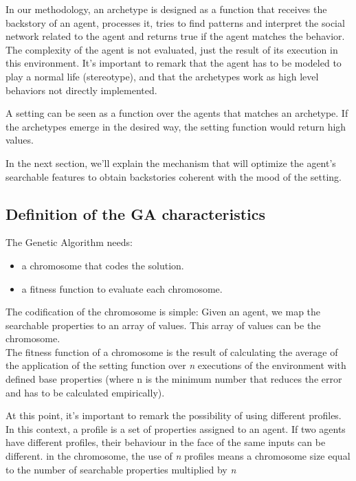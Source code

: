 \documentclass{sig-alternate}
\begin{document}
In our methodology, an archetype is designed as a function that receives the backstory of an agent, processes it, tries to find patterns and interpret the social network related to the agent and returns true if the agent matches the behavior. 
The complexity of the agent is not evaluated, just the result of its execution in this environment. It's important to remark that the agent has to be modeled to play a normal life (stereotype), and that the archetypes work as high level behaviors not directly implemented.

A setting can be seen as a function over the agents that matches an archetype. If the archetypes emerge in the desired way, the setting function would return high values.

In the next section, we'll explain the mechanism that will optimize the agent's searchable features to obtain backstories coherent with the mood of the setting.

\subsection{Definition of the GA characteristics}

The Genetic Algorithm needs:
\begin{itemize}
\item a chromosome that codes the solution.
\item a fitness function to evaluate each chromosome.
\end{itemize}

The codification of the chromosome is simple: Given an agent, we map the searchable properties to an array of values. This array of values can be the chromosome.\\

The fitness function of a chromosome is the result of calculating the average of the application of the setting function over \textit{n} executions of the environment with defined base properties (where n is the minimum number that reduces the error and has to be calculated empirically).


At this point, it's important to remark the possibility of using different profiles. In this context, a profile is a set of properties assigned to an agent. If two agents have different profiles, their behaviour in the face of the same inputs can be different. in the chromosome, the use of \textit{n} profiles means a chromosome size equal to the number of searchable properties multiplied by \textit{n} 
\end{document}
